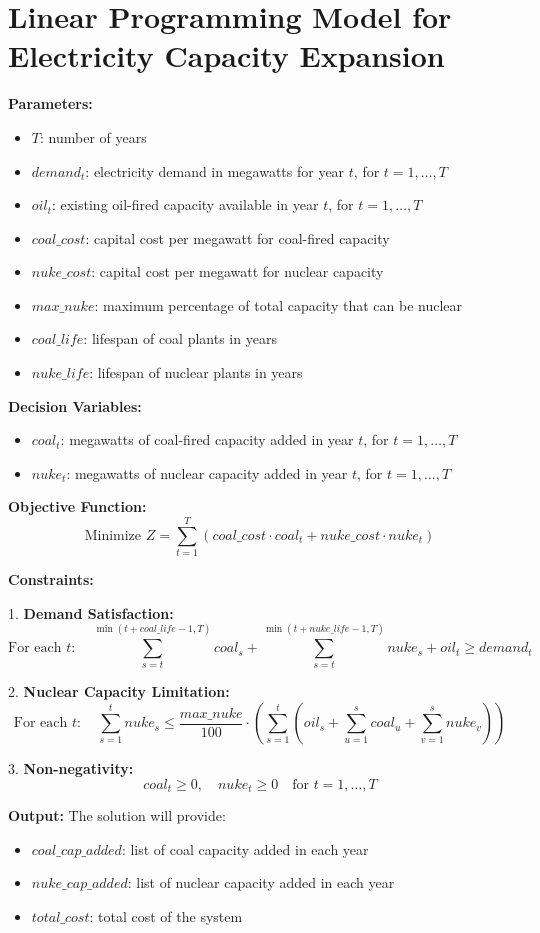 \documentclass{article}
\begin{document}
\section*{Linear Programming Model for Electricity Capacity Expansion}

\textbf{Parameters:}
\begin{itemize}
    \item $T$: number of years
    \item $demand_t$: electricity demand in megawatts for year $t$, for $t = 1, \ldots, T$
    \item $oil_t$: existing oil-fired capacity available in year $t$, for $t = 1, \ldots, T$
    \item $coal\_cost$: capital cost per megawatt for coal-fired capacity
    \item $nuke\_cost$: capital cost per megawatt for nuclear capacity
    \item $max\_nuke$: maximum percentage of total capacity that can be nuclear
    \item $coal\_life$: lifespan of coal plants in years
    \item $nuke\_life$: lifespan of nuclear plants in years
\end{itemize}

\textbf{Decision Variables:}
\begin{itemize}
    \item $coal_t$: megawatts of coal-fired capacity added in year $t$, for $t = 1, \ldots, T$
    \item $nuke_t$: megawatts of nuclear capacity added in year $t$, for $t = 1, \ldots, T$
\end{itemize}

\textbf{Objective Function:}
\[
\text{Minimize } Z = \sum_{t=1}^{T} (coal\_cost \cdot coal_t + nuke\_cost \cdot nuke_t)
\]

\textbf{Constraints:}

1. \textbf{Demand Satisfaction:}
   \[
   \text{For each } t: \quad \sum_{s=t}^{\min(t + coal\_life - 1, T)} coal_s + \sum_{s=t}^{\min(t + nuke\_life - 1, T)} nuke_s + oil_t \geq demand_t
   \]

2. \textbf{Nuclear Capacity Limitation:}
   \[
   \text{For each } t: \quad \sum_{s=1}^{t} nuke_s \leq \frac{max\_nuke}{100} \cdot \left( \sum_{s=1}^{t} \left(oil_s + \sum_{u=1}^{s} coal_u + \sum_{v=1}^{s} nuke_v\right) \right)
   \]

3. \textbf{Non-negativity:}
   \[
   coal_t \geq 0, \quad nuke_t \geq 0 \quad \text{for } t = 1, \ldots, T
   \]

\textbf{Output:}
The solution will provide:
\begin{itemize}
    \item $coal\_cap\_added$: list of coal capacity added in each year
    \item $nuke\_cap\_added$: list of nuclear capacity added in each year
    \item $total\_cost$: total cost of the system
\end{itemize}
\end{document}
